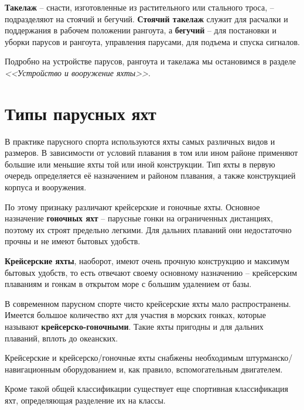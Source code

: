 \documentclass[a4paper, 12pt, twoside, final]{scrbook}
\begin{document}
\textbf{Такелаж} \--- снасти, изготовленные из
растительного или стального троса, \--- подразделяют на стоячий и бегучий.
\textbf{Стоячий такелаж} служит
для расчалки и поддержания в рабочем положении рангоута, а \textbf{бегучий}
\--- для постановки и уборки парусов и рангоута, управления парусами,
для подъема и спуска сигналов.

Подробно на устройстве парусов, рангоута и такелажа мы остановимся
в разделе \emph{<<Устройство и вооружение яхты>>}.

%
%

\section{Типы парусных яхт}

В практике парусного спорта используются яхты самых различных видов
и размеров. В зависимости от условий плавания в том или ином районе
применяют большие или меньшие яхты той или иной конструкции. Тип яхты
в первую очередь определяется её назначением и районом плавания, а
также конструкцией корпуса и вооружения.

По этому признаку различают крейсерские и гоночные яхты. Основное
назначение \textbf{гоночных яхт}
\--- парусные гонки на ограниченных дистанциях, поэтому их строят предельно
легкими. Для дальних плаваний они недостаточно прочны и не имеют бытовых
удобств.

\textbf{Крейсерские яхты},
наоборот, имеют очень прочную конструкцию и максимум бытовых удобств,
то есть отвечают своему основному назначению \--- крейсерским плаваниям
и гонкам в открытом море с большим удалением от базы.

В современном парусном спорте чисто крейсерские яхты мало распространены.
Имеется большое количество яхт для участия в морских гонках, которые
называют \textbf{крейсерско-гоночными}.
Такие яхты пригодны и для дальних плаваний, вплоть до океанских.

Крейсерские и крейсерско\-/гоночные яхты снабжены необходимым штурманско\-/навигационным оборудованием и, как правило, вспомогательным двигателем.

Кроме такой общей классификации существует еще спортивная классификация
яхт, определяющая разделение их на классы.
\end{document}
